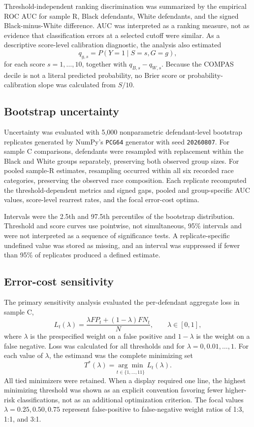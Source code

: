 \documentclass[11pt,letterpaper]{article}
\begin{document}
Threshold-independent ranking discrimination was summarized by the empirical ROC AUC for sample R, Black defendants, White defendants, and the signed Black-minus-White difference. AUC was interpreted as a ranking measure, not as evidence that classification errors at a selected cutoff were similar. As a descriptive score-level calibration diagnostic, the analysis also estimated
\[
q_{g,s}=P(Y=1\mid S=s,G=g),
\]
for each score $s=1,\ldots,10$, together with $q_{B,s}-q_{W,s}$. Because the COMPAS decile is not a literal predicted probability, no Brier score or probability-calibration slope was calculated from $S/10$.

\subsection{Bootstrap uncertainty}

Uncertainty was evaluated with 5,000 nonparametric defendant-level bootstrap replicates generated by NumPy's \texttt{PCG64} generator with seed \texttt{20260807}. For sample C comparisons, defendants were resampled with replacement within the Black and White groups separately, preserving both observed group sizes. For pooled sample-R estimates, resampling occurred within all six recorded race categories, preserving the observed race composition. Each replicate recomputed the threshold-dependent metrics and signed gaps, pooled and group-specific AUC values, score-level rearrest rates, and the focal error-cost optima.

Intervals were the 2.5th and 97.5th percentiles of the bootstrap distribution. Threshold and score curves use pointwise, not simultaneous, 95\% intervals and were not interpreted as a sequence of significance tests. A replicate-specific undefined value was stored as missing, and an interval was suppressed if fewer than 95\% of replicates produced a defined estimate.

\subsection{Error-cost sensitivity}

The primary sensitivity analysis evaluated the per-defendant aggregate loss in sample C,
\[
L_t(\lambda)=\frac{\lambda FP_t+(1-\lambda)FN_t}{N},
\qquad \lambda\in[0,1],
\]
where $\lambda$ is the prespecified weight on a false positive and $1-\lambda$ is the weight on a false negative. Loss was calculated for all thresholds and for $\lambda=0,0.01,\ldots,1$. For each value of $\lambda$, the estimand was the complete minimizing set
\[
T^*(\lambda)=\underset{t\in\{1,\ldots,11\}}{\arg\min}\;L_t(\lambda).
\]
All tied minimizers were retained. When a display required one line, the highest minimizing threshold was shown as an explicit convention favoring fewer higher-risk classifications, not as an additional optimization criterion. The focal values $\lambda=0.25,0.50,0.75$ represent false-positive to false-negative weight ratios of 1:3, 1:1, and 3:1.
\end{document}
